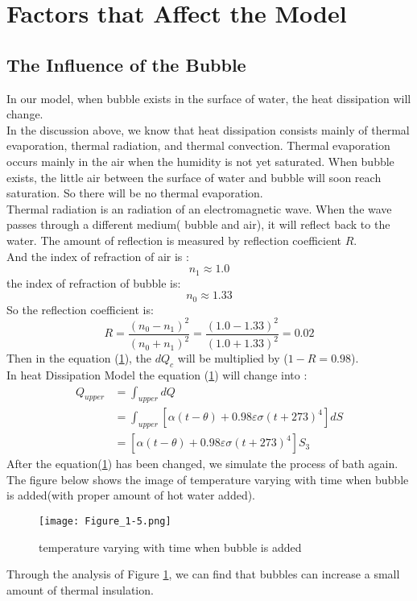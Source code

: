 \documentclass{mcmthesis}
\begin{document}
\section{Factors that Affect the Model}
\subsection{The Influence of the Bubble}
\indent In our model, when bubble exists in the surface of water, the heat dissipation will change.\\
\indent In the discussion above, we know that heat dissipation consists mainly of thermal evaporation, thermal radiation, and thermal convection. Thermal evaporation occurs mainly in the air when the humidity is not yet saturated. When bubble exists, the little air between the surface of water and bubble will soon reach saturation. So there will be no thermal evaporation.\\
\indent Thermal radiation is an radiation of an electromagnetic wave. When the wave passes through a different medium( bubble and air), it will reflect back to the water. The amount of reflection is measured by reflection coefficient $R$.\\
\indent And the index of refraction of air is :
\begin{equation}
n_{1}\approx 1.0
\end{equation}
\indent the index of refraction of bubble is: 
\begin{equation}
n_{0}\approx 1.33
\end{equation}
\indent So the reflection coefficient is: 
\begin{equation}
R=\frac{(n_{0}-n_{1})^{2}}{(n_{0}+n_{1})^{2}}=\frac{(1.0-1.33)^{2}}{(1.0+1.33)^2}=0.02
\end{equation}
\indent Then in the equation (\ref{bubble}), the $dQ_{c}$ will be multiplied by ($1-R=0.98$). \\
\indent In heat Dissipation Model the equation (\ref{bubble}) will change into :
\begin{equation}
\begin{split}
Q_{upper}&=\int_{upper}dQ\\
&=\int_{upper} [\alpha (t-\theta)+0.98\varepsilon \sigma (t+273)^{4}]dS\\
&=[\alpha (t-\theta)+0.98\varepsilon \sigma (t+273)^{4}]S_{3} 
\end{split}
\end{equation} 
\indent After the equation(\ref{bubble}) has been changed, we simulate the process of bath again.\\
\indent The figure below shows the image of temperature varying with time when bubble is added(with proper amount of hot water added).
\begin{figure}[H]
	\centerline{\texttt{[image: Figure\_1-5.png]}}
	\caption{temperature varying with time when bubble is added}
	\label{bubble}
\end{figure}
Through the analysis of Figure \ref{bubble}, we can find that bubbles can increase a small amount of thermal insulation.
\end{document}
